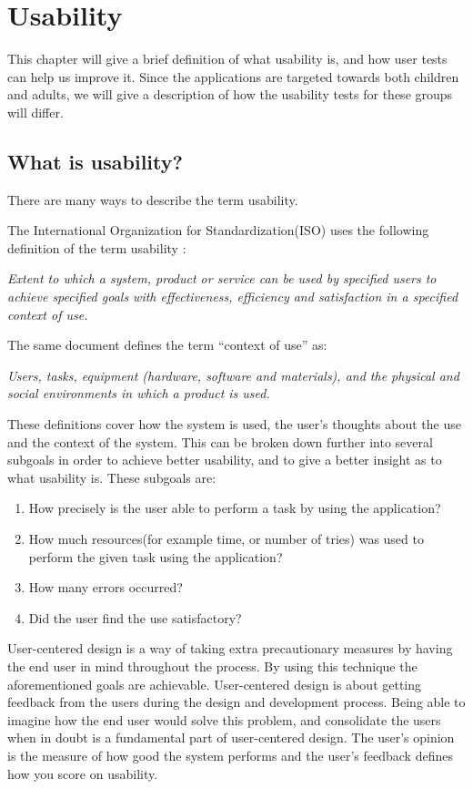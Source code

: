 \chapter{Usability}
\label{chp:usability}

This chapter will give a brief definition of what usability is, and how user tests can help us improve it. Since the applications are targeted towards both children and adults, we will give a description of how the usability tests for these groups will differ.

\section{What is usability?}
\label{sec:usability}
There are many ways to describe the term usability. 

The International Organization for Standardization(ISO) uses the following definition of the term usability \cite{isousability}:

\textit{Extent to which a system, product or service can be used by specified
users to achieve specified goals with effectiveness, efficiency
and satisfaction in a specified context of use.}

The same document defines the term ``context of use'' as:

\textit{Users, tasks, equipment (hardware, software and materials), and
the physical and social environments in which a product is used.}

These definitions cover how the system is used, the user's thoughts about the use and the context of the system. This can be broken down further into several subgoals in order to achieve better usability, and to give a better insight as to what usability is. 
These subgoals are:

\begin{enumerate}
\item{How precisely is the user able to perform a task by using the application?}
\item{How much resources(for example time, or number of tries) was used to perform the given task using the application?}
\item{How many errors occurred?}
\item{Did the user find the use satisfactory?}
\end{enumerate}

User-centered design is a way of taking extra precautionary measures by having the end user in mind throughout the process. By using this technique the aforementioned goals are achievable. User-centered design is about getting feedback from the users during the design and development process. Being able to imagine how the end user would solve this problem, and consolidate the users when in doubt is a fundamental part of user-centered design. The user's opinion is the measure of how good the system performs and the user's feedback defines how you score on usability.


